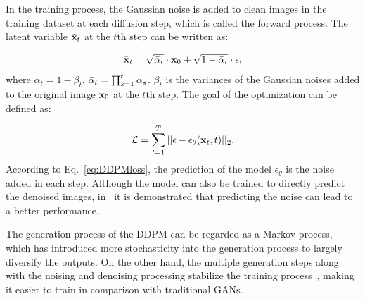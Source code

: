 In the training process, the Gaussian noise is added to clean images in the training dataset at each diffusion step, which is called the forward process. The latent variable $\Tilde{\mathbf{x}}_t$ at the $t$th step can be written as:

\begin{equation}
    \Tilde{\mathbf{x}}_t = \sqrt{\Bar{\alpha}_t}\cdot\mathbf{x}_0+\sqrt{1-\Bar{\alpha}_t}\cdot\epsilon,
\label{eq:DDPMsample}
\end{equation}
%
where $\alpha_t=1-\beta_t$, $\Bar{\alpha}_t=\prod_{s=1}^t{\alpha_s}$. $\beta_t$ is the variances of the Gaussian noises added to the original image $\Tilde{\mathbf{x}}_0$ at the $t$th step. The goal of the optimization can be defined as:

\begin{equation}
    \mathcal{L}=\sum_{t=1}^{T}||\epsilon-\epsilon_\theta(\Tilde{\mathbf{x}}_t, t)||_2.
\label{eq:DDPMloss}
\end{equation}
%
According to Eq.~\ref{eq:DDPMloss}, the prediction of the model $\epsilon_\theta$ is the noise added in each step. Although the model can also be trained to directly predict the denoised images, in~\cite{DDPM} it is demonstrated that predicting the noise can lead to a better performance. 

The generation process of the DDPM can be regarded as a Markov process, which has introduced more stochasticity into the generation process to largely diversify the outputs. On the other hand, the multiple generation steps along with the noising and denoising processing stabilize the training process~\cite{Survey}, making it easier to train in comparison with traditional GANs.
